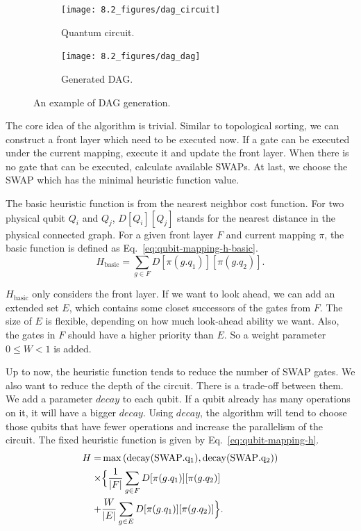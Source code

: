 \begin{figure}
	\centering
	\begin{subfigure}{0.49\textwidth}
		\centering
		\texttt{[image: 8.2\_figures/dag\_circuit]}
		\caption{Quantum circuit.}
	\end{subfigure}
	\begin{subfigure}{0.49\textwidth}
		\centering
		\texttt{[image: 8.2\_figures/dag\_dag]}
		\caption{Generated DAG.}
	\end{subfigure}
	\caption{An example of DAG generation.}
	\label{fig:qubit-mapping-dag}
\end{figure}

The core idea of the algorithm is trivial. Similar to topological sorting, we can construct a front layer which need to be executed now. If a gate can be executed under the current mapping, execute it and update the front layer. When there is no gate that can be executed, calculate available SWAPs. At last, we choose the SWAP which has the minimal heuristic function value.

The basic heuristic function is from the nearest neighbor cost function. For two physical qubit $Q_i$ and $Q_j$, $D[Q_i][Q_j]$ stands for the nearest distance in the physical connected graph. For a given front layer $F$ and current mapping $\pi$, the basic function is defined as
Eq.~\eqref{eq:qubit-mapping-h-basic}.
\begin{equation} \label{eq:qubit-mapping-h-basic}
	H_{\text{basic}} = \sum_{g \in F} D[\pi (g.q_1)][\pi (g.q_2)].
\end{equation}

$H_{\text{basic}}$ only considers the front layer. If we want to look ahead, we can add an extended set $E$, which contains some closet successors of the gates from $F$. The size of $E$ is flexible, depending on how much look-ahead ability we want. Also, the gates in $F$ should have a higher priority than $E$. So a weight parameter $0 \leq W < 1$ is added.

Up to now, the heuristic function tends to reduce the number of SWAP gates. We also want to reduce the depth of the circuit. There is a trade-off between them. We add a parameter $decay$ to each qubit. If a qubit already has many operations on it, it will have a bigger $decay$. Using $decay$, the algorithm will tend to choose those qubits that have fewer operations and increase the parallelism of the circuit. The fixed heuristic function is given by
Eq.~\eqref{eq:qubit-mapping-h}.
\begin{equation} \label{eq:qubit-mapping-h}
	\begin{aligned}
		H =    & \max \left( \rm{decay}(\rm{SWAP.q_1}), \rm{decay}(\rm{SWAP.q_2}) \right)                \\
		\times & \Big\lbrace \frac{1}{|F|} \sum_{g \in F} D[\pi(g.q_1)][\pi(g.q_2)]  \\
		+      & \frac{W}{|E|} \sum_{g \in E} D[\pi(g.q_1)][\pi(g.q_2)] \Big\rbrace.
	\end{aligned}
\end{equation}

